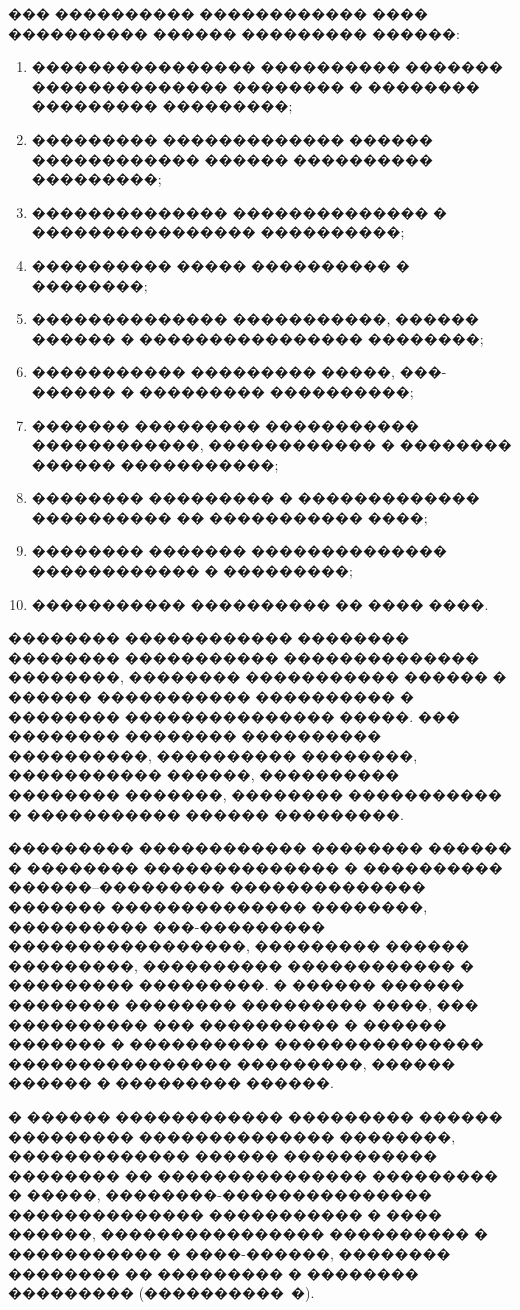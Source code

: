 ��� ���������� ������������ ���� ���������� ������ ��������� ������:
\begin{enumerate}
  \item ���������������� ���������� ������� �������������� �������� � �������� ��������� ���������;
  \item ��������� ������������� ������ ������������ ������ ���������� ���������;
  \item �������������� �������������� � ���������������� ����������;
  \item ���������� ����� ���������� � ��������;
  \item �������������� �����������, ������ ������ � ���������������� ��������;
  \item ����������� ��������� �����, ���-������ � ��������� ����������;
  \item ������� ��������� ����������� ������������, ������������ � �������� ������ �����������;
  \item �������� ��������� � ������������� ���������� �� ����������� ����;
  \item �������� ������� �������������� ������������ � ���������;
  \item ����������� ���������� �� ���� ����.
\end{enumerate}

�������� ������������ �������� �������� ����������� �������������� ��������, �������� ����������� ������ � ������ ����������� ���������� � �������� ��������������� �����. ��� �������� �������� ���������� ����������, ���������� ��������, ����������� ������, ���������� �������� �������, �������� ����������� � ����������� ������ ���������.

��������� ������������ �������� ������ � �������� �������������� � ���������� ������--��������� �������������� ������� �������������� ��������, ���������� ���-��������� �����������������, ��������� ������ ���������, ���������� ������������ � ��������� ���������. � ������ ������ �������� �������� ��������� ����, ��� ���������� ��� ���������� � ������ ������� � ���������� ��������������� ���������������� ���������, ������ ������ � ��������� ������.

� ������ ������������ ��������� ������ ��������� �������������� ��������, ������������� ������ ����������� �������� �� ��������������� ��������� � �����, ��������-��������������� �������������� ����������� � ���� ������, ���������������� ���������� � ����������� � ����-������, �������� �������� �� ��������� � �������� ��������� (����������~�)\cite{grekul_proj_is,kulikov_testing_2024,gost7052008}.

